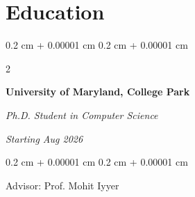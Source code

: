 \documentclass[10pt, letterpaper]{article}
\newenvironment{highlightsforbulletentries}{
    \begin{itemize}[
        topsep=0.10 cm,
        parsep=0.10 cm,
        partopsep=0pt,
        itemsep=0pt,
        leftmargin=10pt
    ]
}{
    \end{itemize}
} %
\newenvironment{onecolentry}{
    \begin{adjustwidth}{
        0.2 cm + 0.00001 cm
    }{
        0.2 cm + 0.00001 cm
    }
}{
    \end{adjustwidth}
} %
\newenvironment{twocolentry}[2][]{
    \onecolentry
    \def\secondColumn{#2}
    \setcolumnwidth{\fill, 4.5 cm}
    \begin{paracol}{2}
}{
    \switchcolumn \raggedleft \secondColumn
    \end{paracol}
    \endonecolentry
} %
\let\hrefWithoutArrow\href
\renewcommand{\href}[2]{\hrefWithoutArrow{#1}{\ifthenelse{\equal{#2}{}}{ }{#2 }\raisebox{.15ex}{\footnotesize \faExternalLink*}}}
\begin{document}

    










    \section{Education}
        \begin{twocolentry}{    
            \textit{Starting Aug 2026}}
            \textbf{University of Maryland, College Park}

            \textit{Ph.D. Student in Computer Science}
        \end{twocolentry}

        \vspace{0.05 cm}
        \begin{onecolentry}
            Advisor: Prof. Mohit Iyyer
        \end{onecolentry}

        \vspace{0.35 cm}
\end{document}

